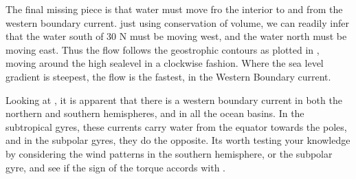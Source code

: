 The final missing piece is that water must move fro the interior to and from the western boundary current.  just using conservation of volume, we can readily infer that the water south of 30 N must be moving west, and the water north must be moving east.  Thus the flow follows the geostrophic contours as plotted in , moving around the high sealevel in a clockwise fashion.  Where the sea level gradient is steepest, the flow is the fastest, in the Western Boundary current.  

Looking at , it is apparent that there is a western boundary current in both the northern and southern hemispheres, and in all the ocean basins.  In the subtropical gyres, these currents carry water from the equator towards the poles, and in the subpolar gyres, they do the opposite.  Its worth testing your knowledge by considering the wind patterns in the southern hemisphere, or the subpolar gyre, and see if the sign of the torque accords with . 




 